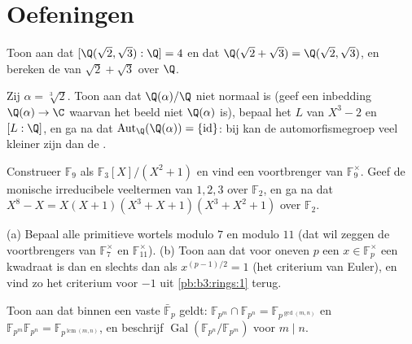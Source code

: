 \section{Oefeningen}

\begin{exercise}[$\star$]\label{exo:b3:galois:1}
Toon aan dat $[\Q(\sqrt2, \sqrt3):\Q] = 4$ en dat $\Q(\sqrt2 +
\sqrt3) = \Q(\sqrt2, \sqrt3)$, en bereken de  van
$\sqrt2 + \sqrt3$ over $\Q$.
\end{exercise}

\begin{exercise}[$\star$]\label{exo:b3:galois:2}
Zij $\alpha = \sqrt[3]2$. Toon aan dat $\Q(\alpha)/\Q$ niet
normaal is (geef een inbedding $\Q(\alpha) \to \C$ waarvan het
beeld niet $\Q(\alpha)$ is), bepaal het  $L$ van
$X^3 - 2$ en $[L:\Q]$, en ga na dat
$\operatorname{Aut}_\Q(\Q(\alpha)) = \{\mathrm{id}\}$: bij
 kan de automorfismegroep veel kleiner
zijn dan de .
\end{exercise}

\begin{exercise}[$\star$]\label{exo:b3:galois:3}
Construeer $\mathbb F_9$ als $\mathbb F_3[X]/(X^2+1)$ en vind een
voortbrenger van $\mathbb F_9^\times$. Geef de monische
irreducibele veeltermen van  $1, 2, 3$ over $\mathbb F_2$, en
ga na dat $X^8 - X = X(X+1)(X^3+X+1)(X^3+X^2+1)$ over $\mathbb
F_2$.
\end{exercise}

\begin{exercise}[$\star\star$]\label{exo:b3:galois:4}
(a) Bepaal alle primitieve wortels modulo $7$ en modulo $11$ (dat
wil zeggen de voortbrengers van $\mathbb F_7^\times$ en $\mathbb
F_{11}^\times$).
(b) Toon aan dat voor oneven $p$ een $x \in \mathbb F_p^\times$
een kwadraat is dan en slechts dan als $x^{(p-1)/2} = 1$ (het
criterium van Euler), en vind zo het criterium voor $-1$ uit
\cref{pb:b3:rings:1} terug.
\end{exercise}

\begin{exercise}[$\star\star$]\label{exo:b3:galois:5}
Toon aan dat binnen een vaste 
$\bar{\mathbb F}_p$ geldt: $\mathbb F_{p^m} \cap \mathbb F_{p^n} =
\mathbb F_{p^{\gcd(m,n)}}$ en $\mathbb F_{p^m}\mathbb F_{p^n} =
\mathbb F_{p^{\operatorname{lcm}(m,n)}}$, en beschrijf
$\operatorname{Gal}(\mathbb F_{p^n}/\mathbb F_{p^m})$ voor $m \mid
n$.
\end{exercise}

